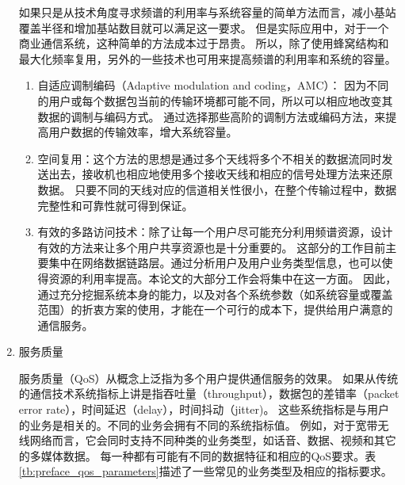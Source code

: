 \begin{enumerate}[1)]
如果只是从技术角度寻求频谱的利用率与系统容量的简单方法而言，减小基站覆盖半径和增加基站数目就可以满足这一要求。
但是实际应用中，对于一个商业通信系统，这种简单的方法成本过于昂贵。
所以，除了使用蜂窝结构和最大化频率复用，另外的一些技术也可用来提高频谱的利用率和系统的容量。
\begin{enumerate}[(1)]
\item 自适应调制编码（Adaptive modulation and coding，AMC）：
因为不同的用户或每个数据包当前的传输环境都可能不同，所以可以相应地改变其数据的调制与编码方式。
通过选择那些高阶的调制方法或编码方法，来提高用户数据的传输效率，增大系统容量。
\item 空间复用：这个方法的思想是通过多个天线将多个不相关的数据流同时发送出去，接收机也相应地使用多个接收天线和相应的信号处理方法来还原数据。
只要不同的天线对应的信道相关性很小，在整个传输过程中，数据完整性和可靠性就可得到保证。
\item 有效的多路访问技术：除了让每一个用户尽可能充分利用频谱资源，设计有效的方法来让多个用户共享资源也是十分重要的。
这部分的工作目前主要集中在网络数据链路层。通过分析用户及用户业务类型信息，也可以使得资源的利用率提高。本论文的大部分工作会将集中在这一方面。
因此，通过充分挖掘系统本身的能力，以及对各个系统参数（如系统容量或覆盖范围）的折衷方案的使用，才能在一个可行的成本下，提供给用户满意的通信服务。
\end{enumerate}
\item{服务质量}

服务质量（QoS）从概念上泛指为多个用户提供通信服务的效果。
如果从传统的通信技术系统指标上讲是指吞吐量（throughput），数据包的差错率（packet error rate），时间延迟（delay），时间抖动（jitter)。
这些系统指标是与用户的业务是相关的。不同的业务会拥有不同的系统指标值。
例如，对于宽带无线网络而言，它会同时支持不同种类的业务类型，如话音、数据、视频和其它的多媒体数据。
每一种都有可能有不同的数据特征和相应的QoS要求。表\ref{tb:preface_qos_parameters}描述了一些常见的业务类型及相应的指标要求。


\end{enumerate}
